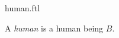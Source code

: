\documentclass{stex}
\begin{document}
\begin{smodule}{human.ftl}



\begin{definition*}[forthel,for=human]
  A \emph{human} is a human being $B$.
\end{definition*}

\end{smodule}
\end{document}
